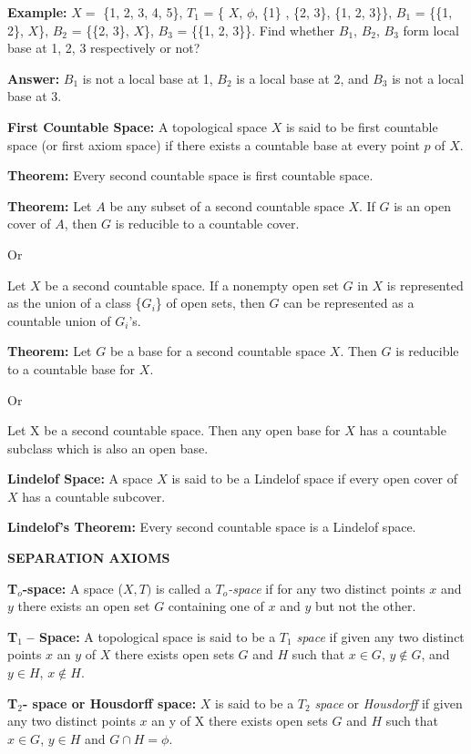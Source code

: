 \documentclass[12pt]{amsart}
\begin{document}
\textbf{Example:} $X =$ {\{}1, 2, 3, 4, 5{\}}, $T_{1}$ = {\{} $X$, $\phi $, {\{}1{\}} 
, {\{}2, 3{\}}, {\{}1, 2, 3{\}}{\}}, $B_{1}$ = {\{}{\{}1, 2{\}}, $X${\}}, 
$B_{2}$ = {\{}{\{}2, 3{\}}, $X${\}}, $B_{3}$ = {\{}{\{}1, 2, 3{\}}{\}}. Find 
whether $B_{1}$, $B_{2}$, $B_{3}$ form local base at 1, 2, 3 respectively or 
not?

\textbf{Answer:} $B_{1}$ is not a local base at 1, $B_{2}$ is a local base at 
2, and $B_{3}$ is not a local base at 3.

\textbf{First Countable Space: }A topological space $X$ is said to be first 
countable space (or first axiom space) if there exists a countable base at 
every point $p$ of $X$.

\textbf{Theorem:} Every second countable space is first countable space.

\textbf{Theorem: }Let $A$ be any subset of a second countable space $X$. If $G$ is an 
open cover of $A$, then $G$ is reducible to a countable cover.

Or

Let $X$ be a second countable space. If a nonempty open set $G$ in $X$ is represented 
as the union of a class {\{}$G_{i}${\}} of open sets, then $G$ can be 
represented as a countable union of $G_{i}$'s.

\textbf{Theorem:} Let $G$ be a base for a second countable space $X$. Then $G$ is 
reducible to a countable base for $X$.

Or

Let X be a second countable space. Then any open base for $X$ has a countable 
subclass which is also an open base.

\textbf{Lindelof Space:} A space $X$ is said to be a Lindelof space if every 
open cover of $X$ has a countable subcover.

\textbf{Lindelof's Theorem: }Every second countable space is a Lindelof 
space.

\textbf{SEPARATION AXIOMS}

\textbf{T}$_{o}$\textbf{-space:} A space ($X, T)$ is called a $T_{o}$\textit{-space }if for any two 
distinct points $x$ and $y$ there exists an open set $G$ containing one of $x$ and $y$ but 
not the other.

\textbf{T}$_{1}$\textbf{ -- Space:} A topological space is said to be a 
$T_{1}$\textit{ space }if given any two distinct points $x$ an $y$ of $X$ there exists open sets $G$ and 
$H$ such that $x\in G$, $y\notin G$, and $y\in H$, $x\notin H$.

\textbf{T}$_{2}$\textbf{- space or Housdorff space:} $X$ is said to be a 
$T_{2}$ \textit{space} or \textit{Housdorff} if given any two distinct points $x$ an y of X there exists open 
sets $G$ and $H$ such that $x\in G$, $y\in H$ and $G\cap H=\phi $.
\end{document}
